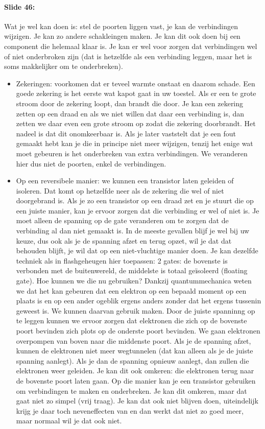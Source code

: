 \documentclass[10pt,a4paper]{book}
\begin{document}
\paragraph{Slide 46:} Wat je wel kan doen is: stel de poorten liggen vast, je kan de verbindingen wijzigen. Je kan zo andere schakleingen maken. Je kan dit ook doen bij een component die helemaal klaar is. Je kan er wel voor zorgen dat verbindingen wel of niet onderbroken zijn (dat is hetzelfde als een verbinding leggen, maar het is soms makkelijker om te onderbreken).
\begin{itemize}
\item Zekeringen: voorkomen dat er teveel warmte onstaat en daarom schade. %
Een goede zekering is het eerste wat kapot gaat in uw toestel. Als er een te grote stroom door de zekering loopt, dan brandt die door. Je kan een zekering zetten op een draad en als we niet willen dat daar een verbinding is, dan zetten we daar even een grote stroom op zodat die zekering doorbrandt. Het nadeel is dat dit onomkeerbaar is. Als je later vaststelt dat je een fout gemaakt hebt kan je die in principe niet meer wijzigen, tenzij het enige wat moet gebeuren is het onderbreken van extra verbindingen. We veranderen hier dus niet de poorten, enkel de verbindingen.
\item Op een reversibele manier: we kunnen een transistor laten geleiden of isoleren. Dat komt op hetzelfde neer als de zekering die wel of niet doorgebrand is. Als je zo een transistor op een draad zet en je stuurt die op een juiste manier, kan je ervoor zorgen dat die verbinding er wel of niet is. Je moet alleen de spanning op de gate veranderen om te zorgen dat de verbinding al dan niet gemaakt is. In de meeste gevallen blijf je wel bij uw keuze, dus ook als je de spanning afzet en terug opzet, wil je dat dat behouden blijft, je wil dat op een niet-vluchtige manier doen. Je kan dezelfde techniek als in flashgeheugen hier toepassen: 2 gates: de bovenste is verbonden met de buitenwereld, de middelste is totaal ge\"isoleerd (floating gate). Hoe kunnen we die nu gebruiken? Dankzij quantummechanica weten we dat het kan gebeuren dat een elektron op een bepaald moment op een plaats is en op een ander ogeblik ergens anders zonder dat het ergens tussenin geweest is. We kunnen daarvan gebruik maken. Door de juiste spanninng op te leggen kunnen we ervoor zorgen dat elektronen die zich op de bovenste poort bevinden zich plots op de onderste poort bevinden. We gaan elektronen overpompen van boven naar die middenste poort. Als je de spanning afzet, kunnen de elektronen niet meer wegtunnelen (dat kan alleen als je de juiste spanning aanlegt). Als je dan de spanning opnieuw aanlegt, dan zullen die elektronen weer geleiden. Je kan dit ook omkeren: die elektronen terug naar de bovenste poort laten gaan. Op die manier kan je een transistor gebruiken om verbindingen te maken en onderbreken. Je kan dit omkeren, maar dat gaat niet zo simpel (vrij traag). Je kan dat ook niet blijven doen, uiteindelijk krijg je daar toch neveneffecten van en dan werkt dat niet zo goed meer, maar normaal wil je dat ook niet. 

\end{itemize}
\end{document}
